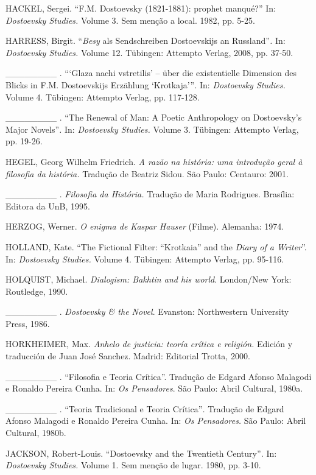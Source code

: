 HACKEL, Sergei. ``F.M. Dostoevsky (1821-1881): prophet manqué?'' In:
\emph{Dostoevsky Studies.} Volume 3. Sem menção a local. 1982, pp. 5-25.

HARRESS, Birgit. ``\emph{Besy} als Sendschreiben Dostoevskijs an
Russland''\emph{.} In: \emph{Dostoevsky Studies.} Volume 12. Tübingen:
Attempto Verlag, 2008, pp. 37-50.

\_\_\_\_\_\_\_\_ . ```Glaza nachi vstretilis' -- über die existentielle
Dimension des Blicks in F.M. Dostoevskijs Erzählung `Krotkaja'''\emph{.}
In: \emph{Dostoevsky Studies.} Volume 4. Tübingen: Attempto Verlag, pp.
117-128.

\_\_\_\_\_\_\_\_ . ``The Renewal of Man: A Poetic Anthropology on
Dostoevsky's Major Novels''\emph{.} In: \emph{Dostoevsky Studies.}
Volume 3. Tübingen: Attempto Verlag, pp. 19-26.

HEGEL, Georg Wilhelm Friedrich. \emph{A razão na história: uma
introdução geral à filosofia da história.} Tradução de Beatriz Sidou.
São Paulo: Centauro: 2001.

\_\_\_\_\_\_\_\_ . \emph{Filosofia da História.} Tradução de Maria
Rodrigues. Brasília: Editora da UnB, 1995.

HERZOG, Werner. \emph{O enigma de Kaspar Hauser} (Filme). Alemanha:
1974.

HOLLAND, Kate. ``The Fictional Filter: ``Krotkaia'' and the \emph{Diary
of a Writer}''. In: \emph{Dostoevsky Studies.} Volume 4. Tübingen:
Attempto Verlag, pp. 95-116.

HOLQUIST, Michael. \emph{Dialogism: Bakhtin and his world}. London/New
York: Routledge, 1990.

\_\_\_\_\_\_\_\_ . \emph{Dostoevsky \& the Novel}. Evanston:
Northwestern University Press, 1986.

HORKHEIMER, Max. \emph{Anhelo de justicia: teoría crítica e religión.}
Edición y traducción de Juan José Sanchez. Madrid: Editorial Trotta,
2000.

\_\_\_\_\_\_\_\_ . ``Filosofia e Teoria Crítica''. Tradução de Edgard
Afonso Malagodi e Ronaldo Pereira Cunha. In: \emph{Os Pensadores}. São
Paulo: Abril Cultural, 1980a.

\_\_\_\_\_\_\_\_ . ``Teoria Tradicional e Teoria Crítica''\emph{.}
Tradução de Edgard Afonso Malagodi e Ronaldo Pereira Cunha. In: \emph{Os
Pensadores.} São Paulo: Abril Cultural, 1980b.

JACKSON, Robert-Louis. ``Dostoevsky and the Twentieth Century''\emph{.}
In: \emph{Dostoevsky Studies.} Volume 1. Sem menção de lugar. 1980, pp.
3-10.

